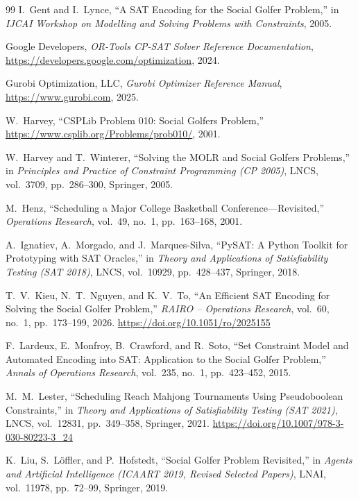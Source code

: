 \documentclass[a4paper,fleqn]{cas-sc}
\begin{document}
\begin{thebibliography}{99}
I.~Gent and I.~Lynce,
``A SAT Encoding for the Social Golfer Problem,''
in \textit{IJCAI Workshop on Modelling and Solving Problems with Constraints}, 2005.

Google Developers,
\textit{OR-Tools CP-SAT Solver Reference Documentation},
\url{https://developers.google.com/optimization}, 2024.

Gurobi Optimization, LLC,
\textit{Gurobi Optimizer Reference Manual},
\url{https://www.gurobi.com}, 2025.

W.~Harvey,
``CSPLib Problem 010: Social Golfers Problem,''
\url{https://www.csplib.org/Problems/prob010/}, 2001.

W.~Harvey and T.~Winterer,
``Solving the MOLR and Social Golfers Problems,''
in \textit{Principles and Practice of Constraint Programming (CP 2005)},
LNCS, vol.~3709, pp.~286--300, Springer, 2005.

M.~Henz,
``Scheduling a Major College Basketball Conference---Revisited,''
\textit{Operations Research}, vol.~49, no.~1, pp.~163--168, 2001.

A.~Ignatiev, A.~Morgado, and J.~Marques-Silva,
``PySAT: A Python Toolkit for Prototyping with SAT Oracles,''
in \textit{Theory and Applications of Satisfiability Testing (SAT 2018)},
LNCS, vol.~10929, pp.~428--437, Springer, 2018.

T.~V.~Kieu, N.~T.~Nguyen, and K.~V.~To,
``An Efficient SAT Encoding for Solving the Social Golfer Problem,''
\textit{RAIRO -- Operations Research}, vol.~60, no.~1, pp.~173--199, 2026. \url{https://doi.org/10.1051/ro/2025155}

F.~Lardeux, E.~Monfroy, B.~Crawford, and R.~Soto,
``Set Constraint Model and Automated Encoding into SAT: Application to the Social Golfer Problem,''
\textit{Annals of Operations Research}, vol.~235, no.~1, pp.~423--452, 2015.

M.~M.~Lester,
``Scheduling Reach Mahjong Tournaments Using Pseudoboolean Constraints,''
in \textit{Theory and Applications of Satisfiability Testing (SAT 2021)},
LNCS, vol.~12831, pp.~349--358, Springer, 2021.
\url{https://doi.org/10.1007/978-3-030-80223-3_24}

K.~Liu, S.~L{\"o}ffler, and P.~Hofstedt,
``Social Golfer Problem Revisited,''
in \textit{Agents and Artificial Intelligence (ICAART 2019, Revised Selected Papers)},
LNAI, vol.~11978, pp.~72--99, Springer, 2019.


\end{thebibliography}
\end{document}
